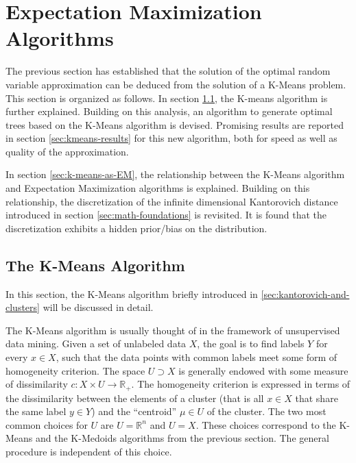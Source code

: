 \section{Expectation Maximization Algorithms}
\label{sec:expect-max-algos}
The previous section has established that the solution of the optimal random variable approximation can be deduced from the solution of a K-Means problem.
This section is organized as follows.
In section \ref{sec:k-means-standard}, the K-means algorithm is further explained.
Building on this analysis, an algorithm to generate optimal trees based on the K-Means algorithm is devised.
Promising results are reported in section \ref{sec:kmeans-results} for this new algorithm, both for speed as well as quality of the approximation.

In section \ref{sec:k-means-as-EM}, the relationship between the K-Means algorithm and Expectation Maximization algorithms is explained.
Building on this relationship, the discretization of the infinite dimensional Kantorovich distance introduced in section \ref{sec:math-foundations} is revisited.
It is found that the discretization exhibits a hidden prior/bias on the distribution.
\subsection{The K-Means Algorithm}
\label{sec:k-means-standard}
In this section, the K-Means algorithm briefly introduced in \ref{sec:kantorovich-and-clusters} will be discussed in detail.

The K-Means algorithm is usually thought of in the framework of unsupervised data mining.
Given a set of unlabeled data $X$, the goal is to find labels $Y$ for every $x\in X$, such that the data points with common labels meet some form of homogeneity criterion.
The space $U\supset X$ is generally endowed with some measure of dissimilarity $c: X\times U\rightarrow \mathbb{R}_+$.
The homogeneity criterion is expressed in terms of the dissimilarity between the elements of a cluster (that is all $x\in X$ that share the same label $y\in Y$) and the ``centroid'' $\mu\in U$ of the cluster.
The two most common choices for $U$ are $U=\mathbb{R}^n$ and  $U=X$.
These choices correspond to the K-Means and the K-Medoids algorithms from the previous section.
The general procedure is independent of this choice.

